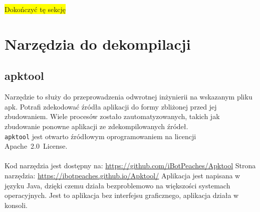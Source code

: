 \documentclass[12pt,a4paper,leqno,oneside,titlepage]{book}
\newcommand{\todo}[1]{\colorbox{yellow}{#1}}
\begin{document}
\todo{Dokończyć tę sekcję}

\chapter{Narzędzia do dekompilacji}

\section{apktool}

Narzędzie to służy do przeprowadzenia odwrotnej inżynierii na wskazanym pliku apk. Potrafi zdekodować źródła aplikacji do formy zbliżonej przed jej zbudowaniem. Wiele procesów zostało zautomatyzowanych, takich jak zbudowanie ponowne aplikacji ze zdekompilowanych źródeł. \\
\lstinline|apktool| jest otwarto źródłowym oprogramowaniem na licencji \mbox{Apache 2.0 License.} \\
\\
Kod narzędzia jest dostępny na: \url{https://github.com/iBotPeaches/Apktool} \newline
Strona narzędzia: \url{https://ibotpeaches.github.io/Apktool/}
\newline
\newline
Aplikacja jest napisana w języku Java, dzięki czemu działa bezproblemowo na większości systemach operacyjnych. Jest to aplikacja bez interfejsu graficznego, aplikacja działa w konsoli.
\end{document}
